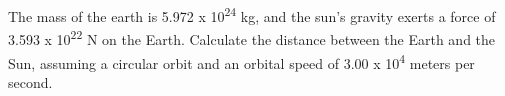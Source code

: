 \documentclass[10pt]{examdesign}
\begin{document}
\begin{shortanswer}[title={Free Response}]
	\begin{question}		
		The mass of the earth is 5.972 x 10\textsuperscript{24} kg, and the sun's gravity exerts a force of 3.593 x 10\textsuperscript{22} N on the Earth. Calculate the distance between the Earth and the Sun, assuming a circular orbit and an orbital speed of 3.00 x 10\textsuperscript{4} meters per second. 
		
		\vspace{2 in}
		\end{question}
	

	
	\end{shortanswer}
\end{document}
